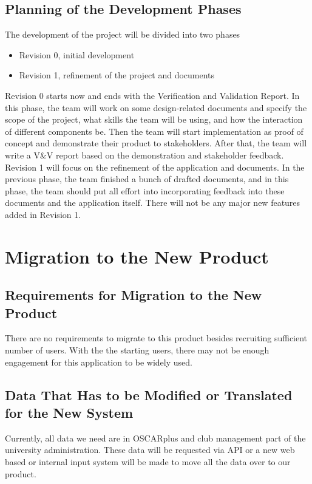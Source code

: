 \documentclass[12pt]{article}
\begin{document}
\subsection{Planning of the Development Phases}
The development of the project will be divided into two phases
\begin{itemize}
    \item Revision 0, initial development
    \item Revision 1, refinement of the project and documents
\end{itemize}
Revision 0 starts now and ends with the Verification and Validation Report. In this phase, the team will work on some design-related documents and specify the scope of the project, what skills the team will be using, and how the interaction of different components be. Then the team will start implementation as proof of concept and demonstrate their product to stakeholders. After that, the team will write a V\&V report based on the demonstration and stakeholder feedback.\\
Revision 1 will focus on the refinement of the application and documents. In the previous phase, the team finished a bunch of drafted documents, and in this phase, the team should put all effort into incorporating feedback into these documents and the application itself. There will not be any major new features added in Revision 1.

\section{Migration to the New Product}
\subsection{Requirements for Migration to the New Product}

\qquad There are no requirements to migrate to this product besides recruiting sufficient number of users.
With the the starting users, there may not be enough engagement for this application to be widely used.

\subsection{Data That Has to be Modified or Translated for the New System}

\qquad Currently, all data we need are in OSCARplus and club management part of the university administration.
These data will be requested via API or a new web based or internal input system will be made to move all the data over to our product.
\end{document}
